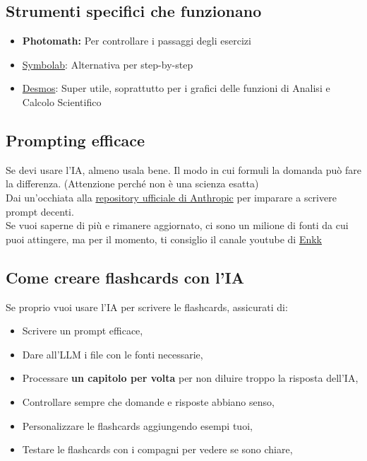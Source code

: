 \documentclass[18pt]{extarticle}
\begin{document}
\subsection{Strumenti specifici che funzionano}
\begin{itemize}
\item \textbf{Photomath:} Per controllare i passaggi degli esercizi
\item \href{https://it.symbolab.com/}{Symbolab}: Alternativa per step-by-step
\item \href{https://www.desmos.com/calculator?lang=it}{Desmos}: Super utile, soprattutto per i grafici delle funzioni di Analisi e Calcolo Scientifico
\end{itemize}


\subsection{Prompting efficace}
Se devi usare l'IA, almeno usala bene. Il modo in cui formuli la domanda può fare la differenza. (Attenzione perché non è una scienza esatta)\\
Dai un'occhiata alla \href{https://github.com/anthropics/prompt-eng-interactive-tutorial}{repository ufficiale di Anthropic} per imparare a scrivere prompt decenti.\\
Se vuoi saperne di più e rimanere aggiornato, ci sono un milione di fonti da cui puoi attingere, ma per il momento, ti consiglio il canale youtube di \href{https://www.youtube.com/@enkk}{Enkk}


\subsection{Come creare flashcards con l'IA}
Se proprio vuoi usare l'IA per scrivere le flashcards, assicurati di:
\begin{itemize}
\item Scrivere un prompt efficace,
\item Dare all'LLM i file con le fonti necessarie,
\item Processare \textbf{un capitolo per volta} per non diluire troppo la risposta dell'IA,
\item Controllare sempre che domande e risposte abbiano senso,
\item Personalizzare le flashcards aggiungendo esempi tuoi,
\item Testare le flashcards con i compagni per vedere se sono chiare,
\end{itemize}
\end{document}
